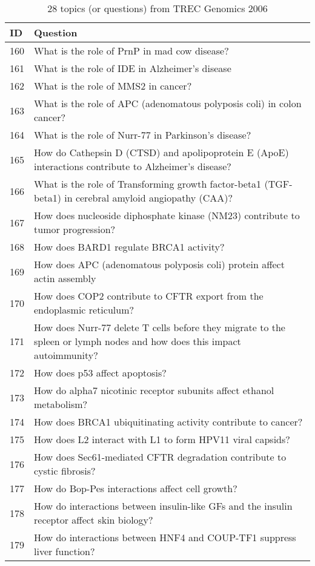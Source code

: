 \begin{table}[t] \centering
\caption{28 topics (or questions) from TREC Genomics 2006\label{tab:question}}
\small
\begin{tabular}{lp{32em}}
\hline
ID & Question \\
\hline
160 & What is the role of PrnP in mad cow disease? \\
161 & What is the role of IDE in Alzheimer's disease \\
162 & What is the role of MMS2 in cancer? \\
163 & What is the role of APC (adenomatous polyposis coli) in colon cancer? \\
164 & What is the role of Nurr-77 in Parkinson's disease? \\
165 & How do Cathepsin D (CTSD) and apolipoprotein E (ApoE) interactions contribute to Alzheimer's disease? \\
166 & What is the role of Transforming growth factor-beta1 (TGF-beta1) in cerebral amyloid angiopathy (CAA)? \\
167 & How does nucleoside diphosphate kinase (NM23) contribute to tumor progression? \\
168 & How does BARD1 regulate BRCA1 activity? \\
169 & How does APC (adenomatous polyposis coli) protein affect actin assembly \\
170 & How does COP2 contribute to CFTR export from the endoplasmic reticulum? \\
171 & How does Nurr-77 delete T cells before they migrate to the spleen or lymph nodes and how does this impact autoimmunity? \\
172 & How does p53 affect apoptosis? \\
173 & How do alpha7 nicotinic receptor subunits affect ethanol metabolism? \\
174 & How does BRCA1 ubiquitinating activity contribute to cancer? \\
175 & How does L2 interact with L1 to form HPV11 viral capsids? \\
176 & How does Sec61-mediated CFTR degradation contribute to cystic fibrosis? \\
177 & How do Bop-Pes interactions affect cell growth? \\
178 & How do interactions between insulin-like GFs and the insulin receptor affect skin biology? \\
179 & How do interactions between HNF4 and COUP-TF1 suppress liver function? \\

\end{tabular}
\end{table}
